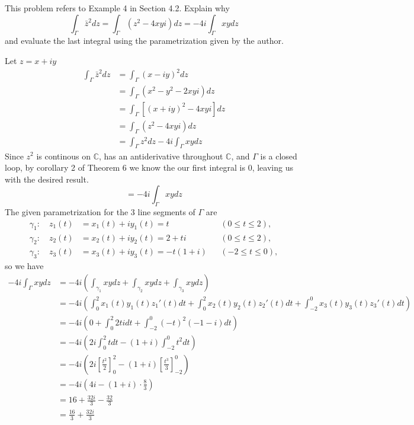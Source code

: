 \documentclass[12pt]{article}
\author{Warren Atkison}
\date{\today}
\newenvironment{problem}[2][Problem]{\begin{trivlist}
\item[\hskip \labelsep {\bfseries #1} \hskip \labelsep {\bfseries #2.}]}{\end{trivlist}}
\begin{document}
\fancyhf{}
\fancyhead[R]{\today}
\fancyfoot[R]{\thepage}

\begin{problem}{1}
	This problem refers to Example 4 in Section 4.2. Explain why
	\[
		\int_{\Gamma} \bar{z}^2dz = \int_{\Gamma}(z^2 - 4xyi)dz = -4i\int_{\Gamma}xydz
	\]
	and evaluate the last integral using the parametrization given by the author.
\end{problem}
Let $z = x + iy$
\begin{align*}
	\int_{\Gamma} \bar{z}^2dz &= \int_{\Gamma} (x - iy)^2dz \\
				  &= \int_{\Gamma} (x^2 - y^2 - 2xyi)dz \\
				  &= \int_{\Gamma} [(x + iy)^2 - 4xyi]dz \\
				  &= \int_{\Gamma} (z^2 - 4xyi)dz \\
				  &= \int_{\Gamma} z^2dz -4i\int_{\Gamma} xydz
\end{align*}
Since $z^2$ is continous on $\mathbb{C}$, has an antiderivative throughout $\mathbb{C}$, and $\Gamma$ is a closed loop, by corollary 2 of Theorem 6 we know the our first integral is 0, leaving us with the desired result.
\[
	= -4i\int_{\Gamma} xydz
\]
The given parametrization for the 3 line segments of $\Gamma$ are
\begin{align*}
	\gamma_1: \quad z_1(t) &= x_1(t) + iy_1(t) = t & &(0 \le t \le 2), \\
	\gamma_2: \quad z_2(t) &= x_2(t) + iy_2(t) = 2 + ti & &(0 \le t \le 2), \\
	\gamma_3: \quad z_3(t) &= x_3(t) + iy_3(t) = -t(1 + i) & &(-2 \le t \le 0),
\end{align*}
so we have
\begin{align*}
	-4i\int_{\Gamma}xydz &= -4i\left(\int_{\gamma_1} xydz + \int_{\gamma_2} xydz + \int_{\gamma_3} xydz\right) \\
			     &= -4i\left(\int_0^2 x_1(t)y_1(t)z_1'(t)dt + \int_0^2 x_2(t)y_2(t)z_2'(t)dt + \int_{-2}^0 x_3(t)y_3(t)z_3'(t)dt\right) \\
			     &= -4i\left(0 + \int_0^2 2tidt + \int_{-2}^0 (-t)^2(-1 - i)dt\right) \\
			     &= -4i\left(2i\int_0^2 tdt - (1 + i)\int_{-2}^0 t^2dt\right) \\
			     &= -4i\left(2i\left[\frac{t^2}{2}\right]_0^2 - (1 + i)\left[\frac{t^3}{3}\right]_{-2}^0\right) \\
			     &= -4i\left(4i - (1 + i)\cdot\frac{8}{3}\right) \\
			     &= 16 + \frac{32i}{3} - \frac{32}{3} \\
			     &= \frac{16}{3} + \frac{32i}{3}
\end{align*}
\end{document}
